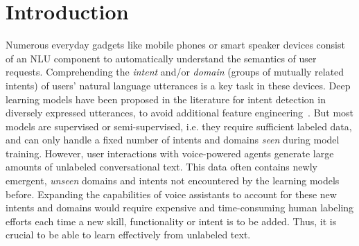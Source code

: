 \section{Introduction}

Numerous everyday gadgets like mobile phones or smart speaker devices consist of an NLU component to automatically understand the semantics %
of user requests. %
Comprehending the \textit{intent} and/or \textit{domain} (groups of mutually related intents) of users' natural language utterances is a key task in these devices. Deep learning models have been proposed in the literature for intent detection in diversely expressed utterances, to avoid additional feature engineering~\cite{bhargava2013,kim2016intent,liu2016attention,sun2016weakly,zhang2016joint,kim2017onenet,goo2018slot}. %
But most models are supervised or semi-supervised, i.e. they require sufficient labeled data, and can only handle a fixed number of intents and domains \textit{seen} during model training.
However, user interactions with voice-powered agents generate large amounts of unlabeled conversational text. This data often contains newly emergent, \textit{unseen} domains and intents not encountered by the learning models before. %
Expanding the capabilities of voice assistants to account for these new intents and domains would require expensive and time-consuming human labeling efforts each time a new skill, functionality or intent is to be added. Thus, it is crucial to be able to learn effectively from unlabeled text.

